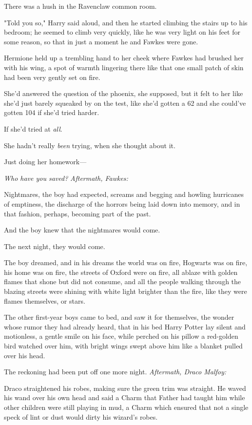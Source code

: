There was a hush in the Ravenclaw common room.

"Told you so," Harry said aloud, and then he started climbing the stairs up to 
his bedroom; he seemed to climb very quickly, like he was very light on his 
feet for some reason, so that in just a moment he and Fawkes were gone.

Hermione held up a trembling hand to her cheek where Fawkes had brushed her 
with his wing, a spot of warmth lingering there like that one small patch of 
skin had been very gently set on fire.

She'd answered the question of the phoenix, she supposed, but it felt to her 
like she'd just barely squeaked by on the test, like she'd gotten a 62 and she 
could've gotten 104 if she'd tried harder.

If she'd tried at \emph{all}.

She hadn't really \emph{been} trying, when she thought about it.

Just doing her homework---

\emph{Who have you saved?}
\sbreak
\emph{Aftermath, Fawkes:}

Nightmares, the boy had expected, screams and begging and howling hurricanes of 
emptiness, the discharge of the horrors being laid down into memory, and in 
that fashion, perhaps, becoming part of the past.

And the boy knew that the nightmares would come.

The next night, they would come.

The boy dreamed, and in his dreams the world was on fire, Hogwarts was on fire, 
his home was on fire, the streets of Oxford were on fire, all ablaze with 
golden flames that shone but did not consume, and all the people walking 
through the blazing streets were shining with white light brighter than the 
fire, like they were flames themselves, or stars.

The other first-year boys came to bed, and saw it for themselves, the wonder 
whose rumor they had already heard, that in his bed Harry Potter lay silent and 
motionless, a gentle smile on his face, while perched on his pillow a 
red-golden bird watched over him, with bright wings swept above him like a 
blanket pulled over his head.

The reckoning had been put off one more night.
\sbreak
\emph{Aftermath, Draco Malfoy:}

Draco straightened his robes, making sure the green trim was straight. He waved 
his wand over his own head and said a Charm that Father had taught him while 
other children were still playing in mud, a Charm which ensured that not a 
single speck of lint or dust would dirty his wizard's robes.

